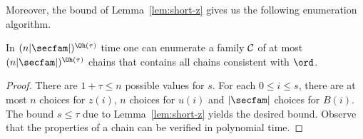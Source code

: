 Moreover, the bound of Lemma~\ref{lem:short-z} gives us the following enumeration algorithm.
\begin{theorem}\label{thm:chain-enum}
In $(n|\secfam|)^{\Oh(\tau)}$ time one can enumerate a family $\mathcal{C}$
of at most $(n|\secfam|)^{\Oh(\tau)}$ chains that contains all chains consistent with $\ord$.
\end{theorem}
\begin{proof}
There are $1+\tau \leq n$ possible values for $s$.
For each $0 \leq i \leq s$, there are at most $n$ choices for $z(i)$,
$n$ choices for $u(i)$ and $|\secfam|$ choices for $B(i)$.
The bound $s \leq \tau$ due to Lemma~\ref{lem:short-z} yields the desired bound.
Observe that the properties of a chain can be verified in polynomial time.
\end{proof}

